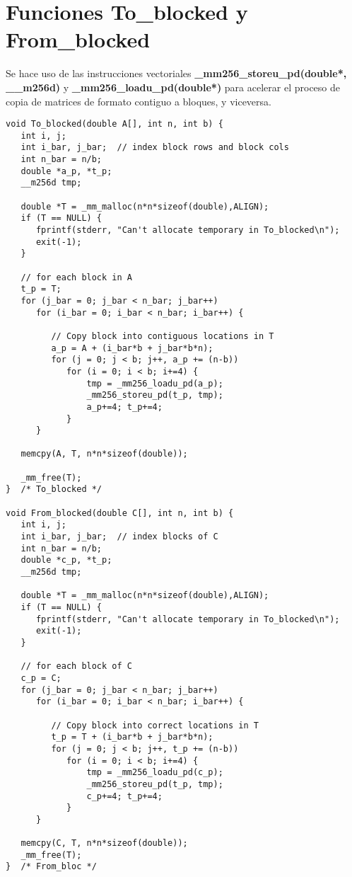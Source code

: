 \documentclass[11pt]{article}
\begin{document}
\section{Funciones To\_blocked y From\_blocked}
Se hace uso de las instrucciones vectoriales \textbf{\_mm256\_storeu\_pd(double*, \_\_m256d)} y \textbf{\_mm256\_loadu\_pd(double*)} para acelerar el proceso de copia de matrices de formato contiguo a bloques, y viceversa.
\begin{verbatim}
void To_blocked(double A[], int n, int b) {
   int i, j;
   int i_bar, j_bar;  // index block rows and block cols
   int n_bar = n/b;
   double *a_p, *t_p;
   __m256d tmp;

   double *T = _mm_malloc(n*n*sizeof(double),ALIGN);
   if (T == NULL) {
      fprintf(stderr, "Can't allocate temporary in To_blocked\n");
      exit(-1);
   }

   // for each block in A
   t_p = T;
   for (j_bar = 0; j_bar < n_bar; j_bar++)
      for (i_bar = 0; i_bar < n_bar; i_bar++) {

         // Copy block into contiguous locations in T
         a_p = A + (i_bar*b + j_bar*b*n);
         for (j = 0; j < b; j++, a_p += (n-b)) 
            for (i = 0; i < b; i+=4) {
                tmp = _mm256_loadu_pd(a_p);
                _mm256_storeu_pd(t_p, tmp);
                a_p+=4; t_p+=4;
            }
      }   

   memcpy(A, T, n*n*sizeof(double));

   _mm_free(T);
}  /* To_blocked */

void From_blocked(double C[], int n, int b) {
   int i, j;
   int i_bar, j_bar;  // index blocks of C
   int n_bar = n/b;
   double *c_p, *t_p;
   __m256d tmp;

   double *T = _mm_malloc(n*n*sizeof(double),ALIGN);
   if (T == NULL) {
      fprintf(stderr, "Can't allocate temporary in To_blocked\n");
      exit(-1);
   }

   // for each block of C
   c_p = C;
   for (j_bar = 0; j_bar < n_bar; j_bar++)
      for (i_bar = 0; i_bar < n_bar; i_bar++) {

         // Copy block into correct locations in T
         t_p = T + (i_bar*b + j_bar*b*n);
         for (j = 0; j < b; j++, t_p += (n-b))
            for (i = 0; i < b; i+=4) {
                tmp = _mm256_loadu_pd(c_p);
                _mm256_storeu_pd(t_p, tmp);
                c_p+=4; t_p+=4;
            }
      }

   memcpy(C, T, n*n*sizeof(double));
   _mm_free(T);
}  /* From_bloc */
\end{verbatim}
\end{document}
